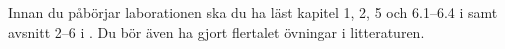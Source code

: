 Innan du påbörjar laborationen ska du ha läst kapitel 1, 2, 5 och 6.1--6.4 
i \cite{Brookshear2012csa} samt avsnitt 2--6 i  
\cite{pythonkramaren1}.
Du bör även ha gjort flertalet övningar i litteraturen.
